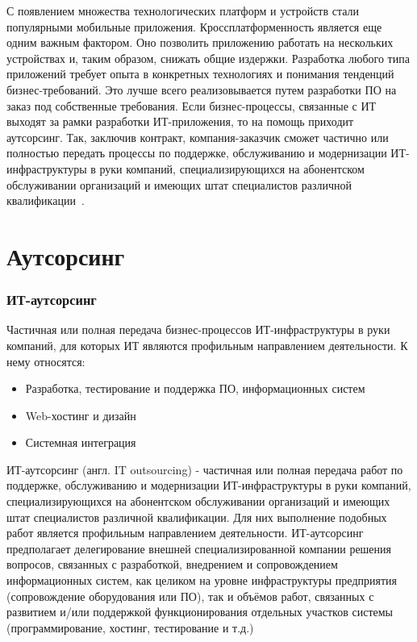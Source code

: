 \documentclass{../industrial-development}
\begin{document}
С появлением множества технологических платформ и устройств стали популярными мобильные приложения. Кроссплатформенность является еще одним важным фактором. Оно позволить приложению работать на нескольких устройствах и, таким образом, снижать общие издержки.
Разработка любого типа приложений требует опыта в конкретных технологиях и понимания тенденций бизнес-требований. Это лучше всего реализовывается путем разработки ПО на заказ под собственные требования. Если бизнес-процессы, связанные с ИТ выходят за рамки разработки ИТ-приложения, то на помощь приходит аутсорсинг. Так, заключив контракт, компания-заказчик сможет частично или полностью передать процессы по поддержке, обслуживанию и модернизации ИТ-инфраструктуры в руки компаний, специализирующихся на абонентском обслуживании организаций и имеющих штат специалистов различной квалификации~\cite{Invensis}. 
\section{Аутсорсинг}


\begin{frame} \frametitle{ИТ-аутсорсинг}
Частичная или полная передача бизнес-процессов ИТ-инфраструктуры в руки компаний, для которых ИТ являются профильным направлением деятельности.
К нему относятся:
\begin{itemize}
	\item Разработка, тестирование и поддержка ПО, информационных систем
	\item Web-хостинг и дизайн
	\item Системная интеграция
\end{itemize}
\end{frame}
\lecturenotes
ИТ-аутсорсинг (англ. IT outsourcing) - частичная или полная передача работ по поддержке, обслуживанию и модернизации ИТ-инфраструктуры в руки компаний, специализирующихся на абонентском обслуживании организаций и имеющих штат специалистов различной квалификации. Для них выполнение подобных работ является профильным направлением деятельности.
ИТ-аутсорсинг предполагает делегирование внешней специализированной компании решения вопросов, связанных с разработкой, внедрением и сопровождением информационных систем, как целиком на уровне инфраструктуры предприятия (сопровождение оборудования или ПО), так и объёмов работ, связанных с развитием и/или поддержкой функционирования отдельных участков системы (программирование, хостинг, тестирование и т.д.)
~\cite[с.~31--38]{Аникин}
\end{document}
